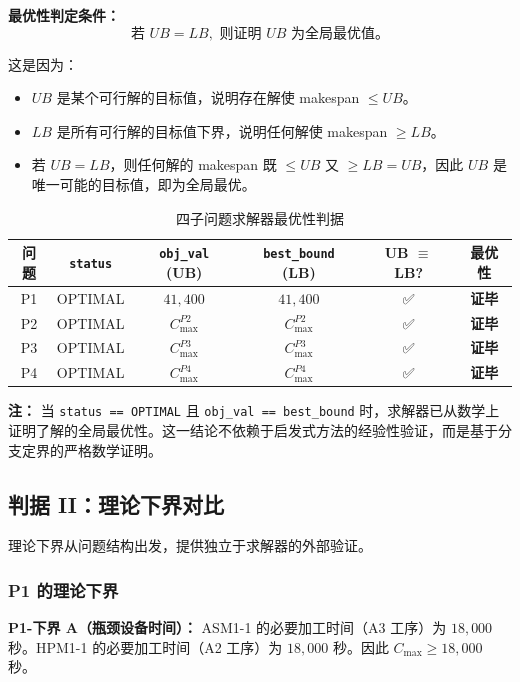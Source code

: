 \documentclass[UTF8,a4paper,12pt]{ctexart}
\begin{document}
\textbf{最优性判定条件：}
\begin{equation}
\text{若 } UB = LB, \text{ 则证明 } UB \text{ 为全局最优值。} \tag{11-2}
\end{equation}

这是因为：
\begin{itemize}
  \item $UB$ 是某个可行解的目标值，说明存在解使 makespan $\leq UB$。
  \item $LB$ 是所有可行解的目标值下界，说明任何解使 makespan $\geq LB$。
  \item 若 $UB = LB$，则任何解的 makespan 既 $\leq UB$ 又 $\geq LB = UB$，因此 $UB$ 是唯一可能的目标值，即为全局最优。
\end{itemize}

\begin{table}[htbp]
  \centering
  \caption{四子问题求解器最优性判据}
  \label{tab:optimality_criteria}
  \begin{tabular}{cccccc}
    \toprule
    问题 & \texttt{status} & \texttt{obj\_val} (UB) & \texttt{best\_bound} (LB) & UB $\equiv$ LB? & 最优性 \\
    \midrule
    P1 & OPTIMAL & $41,400$ & $41,400$ & ✅ & \textbf{证毕} \\
    P2 & OPTIMAL & $C_{\max}^{P2}$ & $C_{\max}^{P2}$ & ✅ & \textbf{证毕} \\
    P3 & OPTIMAL & $C_{\max}^{P3}$ & $C_{\max}^{P3}$ & ✅ & \textbf{证毕} \\
    P4 & OPTIMAL & $C_{\max}^{P4}$ & $C_{\max}^{P4}$ & ✅ & \textbf{证毕} \\
    \bottomrule
  \end{tabular}
\end{table}
\noindent \textbf{注：} 当 \texttt{status == OPTIMAL} 且 \texttt{obj\_val == best\_bound} 时，求解器已从数学上证明了解的全局最优性。这一结论不依赖于启发式方法的经验性验证，而是基于分支定界的严格数学证明。

\subsection{判据 II：理论下界对比}
理论下界从问题结构出发，提供独立于求解器的外部验证。

\subsubsection{P1 的理论下界}
\textbf{P1-下界 A（瓶颈设备时间）：} ASM1-1 的必要加工时间（A3 工序）为 $18,000$ 秒。HPM1-1 的必要加工时间（A2 工序）为 $18,000$ 秒。因此 $C_{\max} \geq 18,000$ 秒。
\end{document}
